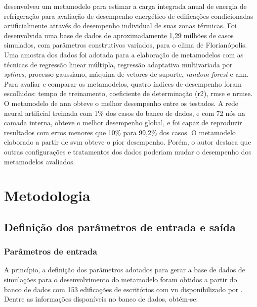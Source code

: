 \documentclass[brazil,hardcopy,openany]{ufscthesis} %
\begin{document}
 desenvolveu um metamodelo para estimar a carga integrada anual de energia de refrigeração para avaliação de desempenho energético de edificações condicionadas artificialmente através do desempenho individual de suas zonas térmicas. Foi desenvolvida uma base de dados de aproximadamente 1,29 milhões de casos simulados, com parâmetros construtivos variados, para o clima de Florianópolis. Uma amostra dos dados foi adotada para a elaboração de metamodelos com as técnicas de regressão linear múltipla, regressão adaptativa multivariada por \textit{splines}, processo gaussiano, máquina de vetores de suporte, \textit{random forest} e \acrlong{ann}. Para avaliar e comparar os metamodelos, quatro índices de desempenho foram escolhidos: tempo de treinamento, coeficiente de determinação (\acrshort{r2}), \acrshort{rmse} e \acrfull{nrmse}. O metamodelo de \acrshort{ann} obteve o melhor desempenho entre os testados. A rede neural artificial treinada com 1\% dos casos do banco de dados, e com 72 nós na camada interna, obteve o melhor desempenho global, e foi capaz de reproduzir resultados com erros menores que 10\% para 99,2\% dos casos. O metamodelo elaborado a partir de \acrshort{svm} obteve o pior desempenho. Porém, o autor destaca que outras configurações e tratamentos dos dados poderiam mudar o desempenho dos metamodelos avaliados.

\chapter{Metodologia}
\label{chapter:metodologia}

\section{Definição dos parâmetros de entrada e saída}

\subsection{Parâmetros de entrada}\label{subsec:par}

A princípio, a definição dos parâmetros adotados para gerar a base de dados de simulações para o desenvolvimento do metamodelo foram obtidos a partir do banco de dados com 153 edificações de escritórios com \acrfull{vn} disponibilizado por .  		
Dentre as informações  disponíveis no banco de dados, obtém-se:
\end{document}
